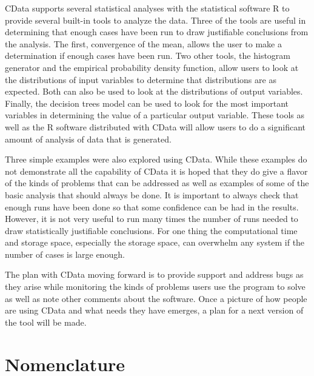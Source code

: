 \documentclass[12pt,twoside]{book}
\begin{document}
CData supports several statistical analyses with the statistical software R to provide several built-in tools to analyze the data. Three of the tools are useful in determining that enough cases have been run to draw justifiable conclusions from the analysis. The first, convergence of the mean, allows the user to make a determination if enough cases have been run. Two other tools, the histogram generator and the empirical probability density function, allow users to look at the distributions of input variables to determine that distributions are as expected. Both can also be used to look at the distributions of output variables. Finally, the decision trees model can be used to look for the most important variables in determining the value of a particular output variable. These tools as well as the R software distributed with CData will allow users to do a significant amount of analysis of data that is generated.

Three simple examples were also explored using CData. While these examples do not demonstrate all the capability of CData it is hoped that they do give a flavor of the kinds of problems that can be addressed as well as examples of some of the basic analysis that should always be done. It is important to always check that enough runs have been done so that some confidence can be had in the results. However, it is not very useful to run many times the number of runs needed to draw statistically justifiable conclusions. For one thing the computational time and storage space, especially the storage space, can overwhelm any system if the number of cases is large enough.

The plan with CData moving forward is to provide support and address bugs as they arise while monitoring the kinds of problems users use the program to solve as well as note other comments about the software. Once a picture of how people are using CData and what needs they have emerges, a plan for a next version of the tool will be made.





\appendix
{}

%
%

\chapter{Nomenclature}
\label{nomenclature}
\end{document}
